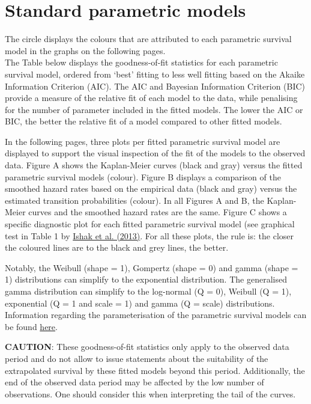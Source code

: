 \documentclass[]{article}
\begin{document}
\newpage

\section{Standard parametric models}\label{standard-parametric-models}

The circle displays the colours that are attributed to each parametric
survival model in the graphs on the following pages.\\
The Table below displays the goodness-of-fit statistics for each
parametric survival model, ordered from `best' fitting to less well
fitting based on the Akaike Information Criterion (AIC). The AIC and
Bayesian Information Criterion (BIC) provide a measure of the relative
fit of each model to the data, while penalising for the number of
parameter included in the fitted models. The lower the AIC or BIC, the
better the relative fit of a model compared to other fitted models.

In the following pages, three plots per fitted parametric survival model
are displayed to support the visual inspection of the fit of the models
to the observed data. Figure A shows the Kaplan-Meier curves (black and
gray) versus the fitted parametric survival models (colour). Figure B
displays a comparison of the smoothed hazard rates based on the
empirical data (black and gray) versus the estimated transition
probabilities (colour). In all Figures A and B, the Kaplan-Meier curves
and the smoothed hazard rates are the same. Figure C shows a specific
diagnostic plot for each fitted parametric survival model (see graphical
test in Table 1 by
\href{https://doi.org/10.1007/s40273-013-0064-3}{Ishak et al. (2013)}.
For all these plots, the rule is: the closer the coloured lines are to
the black and grey lines, the better.

Notably, the Weibull (shape = 1), Gompertz (shape = 0) and gamma (shape
= 1) distributions can simplify to the exponential distribution. The
generalised gamma distribution can simplify to the log-normal (Q = 0),
Weibull (Q = 1), exponential (Q = 1 and scale = 1) and gamma (Q = scale)
distributions. Information regarding the parameterisation of the
parametric survival models can be found
\href{https://devinincerti.com/code/survival-distributions.html}{here}.

\textbf{CAUTION}: These goodness-of-fit statistics only apply to the
observed data period and do not allow to issue statements about the
suitability of the extrapolated survival by these fitted models beyond
this period. Additionally, the end of the observed data period may be
affected by the low number of observations. One should consider this
when interpreting the tail of the curves.
\end{document}
